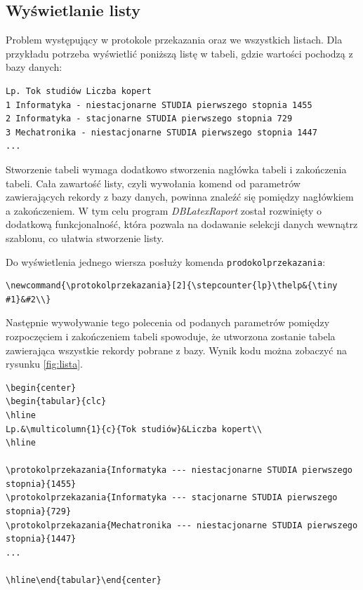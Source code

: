  \subsection{Wyświetlanie listy}
Problem występujący w protokole przekazania oraz we wszystkich listach. Dla przykładu potrzeba wyświetlić poniższą listę w tabeli, gdzie wartości pochodzą z bazy danych:
\begin{lstlisting}
Lp. Tok studiów Liczba kopert
1 Informatyka - niestacjonarne STUDIA pierwszego stopnia 1455
2 Informatyka - stacjonarne STUDIA pierwszego stopnia 729
3 Mechatronika - niestacjonarne STUDIA pierwszego stopnia 1447
...
\end{lstlisting}
\vspace{5mm}
\par
Stworzenie tabeli wymaga dodatkowo stworzenia nagłówka tabeli i zakończenia tabeli. Cała zawartość listy, czyli wywołania komend  od parametrów zawierających rekordy z bazy danych, powinna znaleźć się pomiędzy nagłówkiem a zakończeniem. W tym celu program \emph{DBLatexRaport} został rozwinięty o dodatkową funkcjonalność, która pozwala na dodawanie selekcji danych wewnątrz szablonu, co ułatwia stworzenie listy. 
\par
Do wyświetlenia jednego wiersza posłuży komenda \texttt{prodokolprzekazania}:
\vspace{5mm}
\begin{lstlisting}
\newcommand{\protokolprzekazania}[2]{\stepcounter{lp}\thelp&{\tiny #1}&#2\\}
\end{lstlisting}
\vspace{3mm}
\par
Następnie wywoływanie tego polecenia od podanych parametrów pomiędzy rozpoczęciem i zakończeniem tabeli spowoduje, że utworzona zostanie tabela zawierająca wszystkie rekordy pobrane z bazy. Wynik kodu można zobaczyć na rysunku \ref{fig:lista}.
\begin{lstlisting}
\begin{center}
\begin{tabular}{clc}
\hline
Lp.&\multicolumn{1}{c}{Tok studiów}&Liczba kopert\\
\hline

\protokolprzekazania{Informatyka --- niestacjonarne STUDIA pierwszego stopnia}{1455}
\protokolprzekazania{Informatyka --- stacjonarne STUDIA pierwszego stopnia}{729}
\protokolprzekazania{Mechatronika --- niestacjonarne STUDIA pierwszego stopnia}{1447}
...

\hline\end{tabular}\end{center}
\end{lstlisting}

